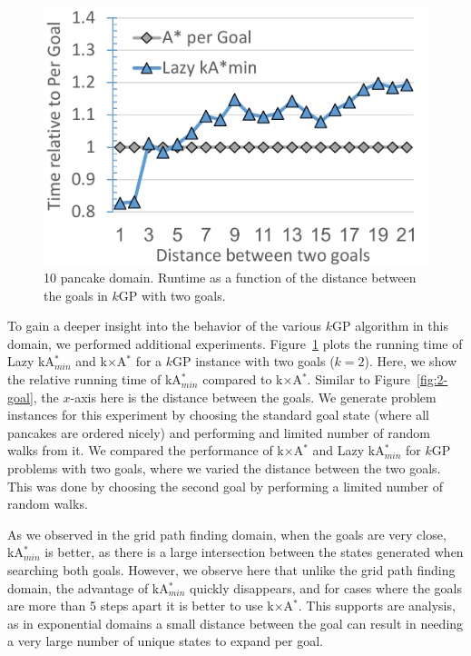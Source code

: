 \documentclass{aicom2e}
\newcommand{\kgs}{$k$GP}
\newcommand{\kastarmin}{kA$^*_{min}$}
\newcommand{\kxastar}{k$\times$A$^*$}
\begin{document}
\begin{figure}
	\includegraphics[width=\columnwidth]{pancake-goal-distance_cropped.pdf}
	\caption{10 pancake domain. Runtime as a function of the distance between the goals in \kgs{} with two goals.}
	\label{fig:2-goal-pancake}
\end{figure}


To gain a deeper insight into the behavior of the various \kgs{} algorithm in this domain, we performed additional experiments.  Figure~\ref{fig:2-goal-pancake} plots the running time of Lazy \kastarmin{} and \kxastar{} for a \kgs{} instance with two goals ($k=2$). Here, we show the relative running time of \kastarmin{} compared to \kxastar{}. Similar to Figure~\ref{fig:2-goal}, the $x$-axis here is the distance between the goals. We generate problem instances for this experiment by choosing the standard goal state (where all pancakes are ordered nicely) and performing and limited number of random walks from it. We compared the performance of \kxastar{} and Lazy \kastarmin{} for \kgs{} problems with two goals, where we varied the distance between the two goals. This was done by choosing the second goal by performing a limited number of random walks. 


As we observed in the grid path finding domain, when the goals are very close, \kastarmin{} is better, as there is a large intersection between the states generated when searching both goals. However, we observe here that unlike the grid path finding domain, the advantage of \kastarmin{} quickly disappears, and for cases where the goals are more than 5 steps apart it is better to use \kxastar{}. This supports are analysis, as in exponential domains a small distance between the goal can result in needing a very large number of unique states to expand per goal.  
\end{document}
